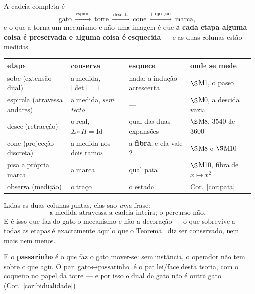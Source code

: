 \documentclass[livro.tex]{subfiles}
\begin{document}
\begin{observacao}\label{obs:razao}
A cadeia completa é
\[
\text{gato}\ \xrightarrow{\ \text{espiral}\ }\ \text{torre}
\ \xrightarrow{\ \text{descida}\ }\ \text{cone}
\ \xrightarrow{\ \text{projecção}\ }\ \text{marca},
\]
e o que a torna um mecanismo e não uma imagem é que \textbf{a cada etapa
alguma coisa é preservada e alguma coisa é esquecida} --- e as duas
colunas estão medidas.

\begin{center}\small
\begin{tabular}{@{}llll@{}}
\toprule
etapa & conserva & esquece & onde se mede \\
\midrule
sobe (extensão dual) & a medida, $|\det|=1$ & nada: a indução
acrescenta & $\S$M1, o passo \\
espirala (atravessa andares) & a medida, \emph{sem tecto} & --- &
$\S$M0, a descida vazia \\
desce (retracção) & o real, $\Sigma\circ\Pi=\mathrm{Id}$ & qual das duas
expansões & $\S$M8, $3540$ de $3600$ \\
cone (projecção discreta) & a medida nos dois ramos & a \textbf{fibra},
e ela vale $2$ & $\S$M8 e $\S$M10 \\
pisa a própria marca & a marca & qual pata & $\S$M10, fibra de
$x\mapsto x^{2}$ \\
observa (medição) & o traço & o estado & Cor.~\ref{cor:pata} \\
\bottomrule
\end{tabular}
\end{center}

\noindent Lidas as duas colunas juntas, elas são \emph{uma} frase:
\[
\boxed{\;\text{a medida atravessa a cadeia inteira; o percurso não.}\;}
\]
E é isso que faz do gato o mecanismo e não a decoração --- o que sobrevive
a todas as etapas é exactamente aquilo que o Teorema~ diz
ser conservado, nem mais nem menos.

\medskip
\noindent E o \textbf{passarinho} é o que faz o gato mover-se: sem
instância, o operador não tem sobre o que agir. O par
$\text{gato}\leftrightarrow\text{passarinho}$ é o par lei/face desta
teoria, com o coqueiro no papel da torre --- e por isso o dual do gato
não é outro gato (Cor.~\ref{cor:bidualidade}).
\end{observacao}
\end{document}
